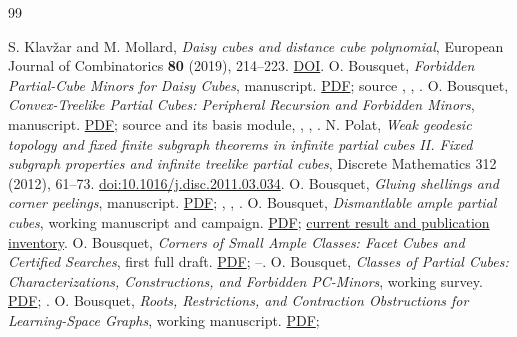 \documentclass[11pt]{article}
\theoremstyle{definition}
\begin{document}
\small
\begin{thebibliography}{99}
\raggedright
{} S. Klav\v{z}ar and M. Mollard,
\emph{Daisy cubes and distance cube polynomial},
European Journal of Combinatorics \textbf{80} (2019), 214--223.
\href{https://doi.org/10.1016/j.ejc.2018.02.019}{DOI}.
 O. Bousquet,
\emph{Forbidden Partial-Cube Minors for Daisy Cubes}, manuscript.
\href{https://research.obousquet.uk/repos/PartialCubes/papers/daisy-cubes/main.pdf}{PDF}; source ,
, .
 O. Bousquet,
\emph{Convex-Treelike Partial Cubes: Peripheral Recursion and Forbidden
Minors}, manuscript. \href{https://research.obousquet.uk/repos/PartialCubes/papers/cover-recursive/main.pdf}{PDF};
source  and its basis module,
, ,
.
 N. Polat,
\emph{Weak geodesic topology and fixed finite subgraph theorems in infinite
partial cubes II. Fixed subgraph properties and infinite treelike partial cubes},
Discrete Mathematics 312 (2012), 61--73.
\href{https://doi.org/10.1016/j.disc.2011.03.034}{doi:10.1016/j.disc.2011.03.034}.
 O. Bousquet,
\emph{Gluing shellings and corner peelings}, manuscript.
\href{https://research.obousquet.uk/repos/PartialCubes/papers/gluing/main.pdf}{PDF};
, ,
.
 O. Bousquet,
\emph{Dismantlable ample partial cubes}, working manuscript and campaign.
\href{https://research.obousquet.uk/repos/PartialCubes/papers/dismantlable-ample/main.pdf}{PDF};
\href{https://research.obousquet.uk/repos/PartialCubes/PUBLICATION_INVENTORY.md.html}{current result and publication inventory}.
 O. Bousquet,
\emph{Corners of Small Ample Classes: Facet Cubes and Certified Searches},
first full draft.
\href{https://research.obousquet.uk/repos/PartialCubes/papers/ample-corners/main.pdf}{PDF};
--.
 O. Bousquet,
\emph{Classes of Partial Cubes: Characterizations, Constructions, and
Forbidden PC-Minors}, working survey. \href{https://research.obousquet.uk/repos/PartialCubes/papers/survey/main.pdf}{PDF};
.
 O. Bousquet,
\emph{Roots, Restrictions, and Contraction Obstructions for Learning-Space Graphs},
working manuscript.
\href{https://research.obousquet.uk/repos/PartialCubes/papers/learning-spaces/main.pdf}{PDF};

\end{thebibliography}
\end{document}
